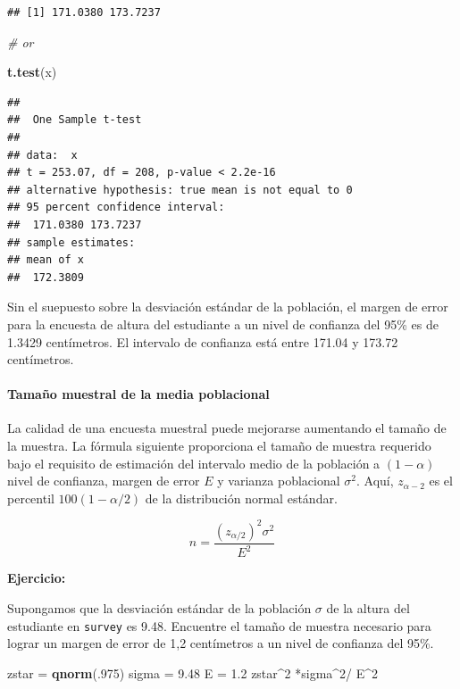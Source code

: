 \documentclass[]{article}
\newenvironment{Shaded}{\begin{snugshade}}{\end{snugshade}}
\newcommand{\KeywordTok}[1]{\textcolor[rgb]{0.13,0.29,0.53}{\textbf{{#1}}}}
\newcommand{\DecValTok}[1]{\textcolor[rgb]{0.00,0.00,0.81}{{#1}}}
\newcommand{\FloatTok}[1]{\textcolor[rgb]{0.00,0.00,0.81}{{#1}}}
\newcommand{\StringTok}[1]{\textcolor[rgb]{0.31,0.60,0.02}{{#1}}}
\newcommand{\CommentTok}[1]{\textcolor[rgb]{0.56,0.35,0.01}{\textit{{#1}}}}
\newcommand{\NormalTok}[1]{{#1}}
\numberwithin{equation}{section}
\begin{document}
\begin{verbatim}
## [1] 171.0380 173.7237
\end{verbatim}

\begin{Shaded}
\begin{Highlighting}[]
\CommentTok{# or }

\KeywordTok{t.test}\NormalTok{(x)}
\end{Highlighting}
\end{Shaded}

\begin{verbatim}
## 
##  One Sample t-test
## 
## data:  x
## t = 253.07, df = 208, p-value < 2.2e-16
## alternative hypothesis: true mean is not equal to 0
## 95 percent confidence interval:
##  171.0380 173.7237
## sample estimates:
## mean of x 
##  172.3809
\end{verbatim}

Sin el suepuesto sobre la desviación estándar de la población, el margen
de error para la encuesta de altura del estudiante a un nivel de
confianza del 95\% es de 1.3429 centímetros. El intervalo de confianza
está entre 171.04 y 173.72 centímetros.

\paragraph{Tamaño muestral de la media
poblacional}\label{tamano-muestral-de-la-media-poblacional}

La calidad de una encuesta muestral puede mejorarse aumentando el tamaño
de la muestra. La fórmula siguiente proporciona el tamaño de muestra
requerido bajo el requisito de estimación del intervalo medio de la
población a \((1-\alpha)\) nivel de confianza, margen de error \(E\) y
varianza poblacional \(\sigma^2\). Aquí, \(z_{\alpha-2}\) es el
percentil \(100 (1 -\alpha/2)\) de la distribución normal estándar.

\[
    n = \frac{(z_{\alpha/2})^2 \sigma^2}{E^2}
\]

\textbf{Ejercicio:}

Supongamos que la desviación estándar de la población \(\sigma\) de la
altura del estudiante en \texttt{survey} es 9.48. Encuentre el tamaño de
muestra necesario para lograr un margen de error de 1,2 centímetros a un
nivel de confianza del 95\%.

\begin{Shaded}
\begin{Highlighting}[]
\NormalTok{zstar =}\StringTok{ }\KeywordTok{qnorm}\NormalTok{(.}\DecValTok{975}\NormalTok{) }
\NormalTok{sigma =}\StringTok{ }\FloatTok{9.48} 
\NormalTok{E =}\StringTok{ }\FloatTok{1.2} 
\NormalTok{zstar^}\DecValTok{2} \NormalTok{*sigma^}\DecValTok{2}\NormalTok{/}\StringTok{ }\NormalTok{E^}\DecValTok{2} 
\end{Highlighting}
\end{Shaded}
\end{document}

